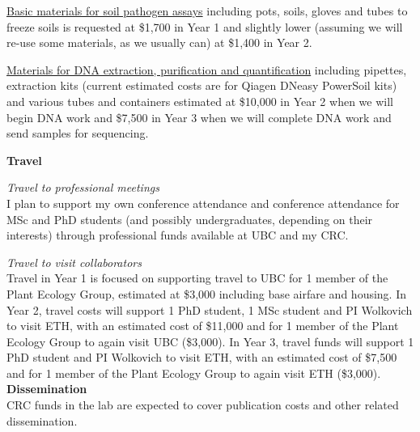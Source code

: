 \documentclass[12pt,oneside]{article}
\begin{document}
\underline{Basic materials for soil pathogen assays} including pots, soils, gloves and tubes to freeze soils is requested at \$1,700 in Year 1 and slightly lower (assuming we will re-use some materials, as we usually can) at \$1,400 in Year 2. 

\underline{Materials for DNA extraction, purification and quantification} including pipettes, extraction kits (current estimated costs are for Qiagen DNeasy PowerSoil kits) and various tubes and containers estimated at \$10,000 in Year 2 when we will begin DNA work and \$7,500 in Year 3 when we will complete DNA work and send samples for sequencing. 

{\bf Travel}

\emph{Travel to professional meetings}\\
I plan to support my own conference attendance and conference attendance for MSc and PhD students (and possibly undergraduates, depending on their interests) through professional funds available at UBC and my CRC. %

\emph{Travel to visit collaborators}\\
Travel in Year 1 is focused on supporting travel to UBC for 1 member of the Plant Ecology Group, estimated at \$3,000 including base airfare and housing. In Year 2, travel costs will support 1 PhD student, 1 MSc student and PI Wolkovich to visit ETH, with an estimated cost of \$11,000 and for 1 member of the Plant Ecology Group to again visit UBC (\$3,000). In Year 3,  travel funds will support 1 PhD student and PI Wolkovich to visit ETH, with an estimated cost of \$7,500 and for 1 member of the Plant Ecology Group to again visit ETH (\$3,000). \\

{\bf Dissemination}\\ 
CRC funds in the lab are expected to cover publication costs and other related dissemination. \\
\end{document}
